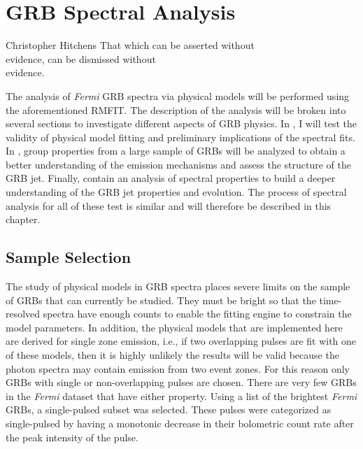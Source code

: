 \chapter{GRB Spectral Analysis}
\label{ch:analysis}
\begin{chapterquote}{Christopher Hitchens}
That which can be asserted without\\ evidence,
 can be dismissed without\\ evidence.
\end{chapterquote}

The analysis of {\it Fermi} GRB spectra via physical models will be
performed using the aforementioned RMFIT. The description of the
analysis will be broken into several sections to investigate different
aspects of GRB physics. In , I will test the
validity of physical model fitting and preliminary implications of the
spectral fits. In , group properties from a large
sample of GRBs will be analyzed to obtain a better understanding of
the emission mechanisms and assess the structure of the GRB
jet. Finally,  contain an analysis of
spectral properties to build a deeper understanding of the GRB jet
properties and evolution. The process of spectral analysis for all of
these test is similar and will therefore be described in this chapter.




\section{Sample Selection}
The study of physical models in GRB spectra places severe limits on
the sample of GRBs that can currently be studied. They must be bright
so that the time-resolved spectra have enough counts to enable the
fitting engine to constrain the model parameters. In addition, the
physical models that are implemented here are derived for single zone
emission, i.e., if two overlapping pulses are fit with one of these
models, then it is highly unlikely the results will be valid because
the photon spectra may contain emission from two event zones. For this
reason only GRBs with single or non-overlapping pulses are
chosen. There are very few GRBs in the {\it Fermi} dataset that have
either property. Using a list of the brightest {\it Fermi} GRBs, a
single-pulsed subset was selected. These pulses were categorized as
single-pulsed by having a monotonic decrease in their bolometric count
rate after the peak intensity of the pulse.

